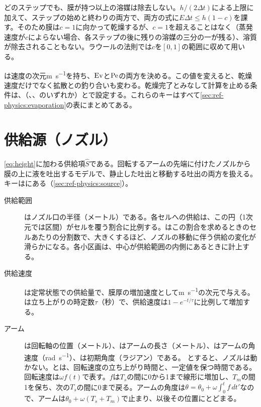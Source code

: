 どのステップでも、膜が持つ以上の溶媒は除去しない。$h/(2\Delta t)$による上限に加えて、ステップの始めと終わりの両方で、両方の式に$E\Delta t \le h(1-c)$を課す。そのため膜は$c = 1$に向かって乾燥するが、$c = 1$を超えることはなく（蒸発速度が$c$によらない場合、各ステップの後に残りの溶媒の三分の一が残る）、溶質が除去されることもない。ラウールの法則では$c$を$[0, 1]$の範囲に収めて用いる。

は速度の次元\si{\metre\per\second}を持ち、$\mathrm{Ev}$と$\mathrm{Pe}$の両方を決める。この値を変えると、乾燥速度だけでなく拡散との釣り合いも変わる。乾燥完了とみなして計算を止める条件は、（、、のいずれか）とで設定する。これらのキーはすべて\cref{sec:ref-physics:evaporation}の表にまとめてある。

\section{供給源（ノズル）}
\label{sec:terms:source}

\cref{eq:height}に加わる供給項$\hat{S}$である。回転するアームの先端に付けたノズルから膜の上に液を吐出するモデルで、静止した吐出と移動する吐出の両方を扱える。キーはにある（\cref{sec:ref-physics:source}）。

\begin{description}
  \item[供給範囲] はノズル口の半径（メートル）である。各セルへの供給は、この円（1次元では区間）がセルを覆う割合に比例する。はこの割合を求めるときのセルあたりの分割数で、大きくするほど、ノズルの移動に伴う供給の変化が滑らかになる。各小区画は、中心が供給範囲の内側にあるときに計上する。
  \item[供給速度] は定常状態での供給量で、膜厚の増加速度として\si{\metre\per\second}の次元で与える。は立ち上がりの時定数$\tau$（秒）で、供給速度は$1 - e^{-t/\tau}$に比例して増加する。
  \item[アーム] は回転軸の位置（メートル）、はアームの長さ（メートル）、はアームの角速度（\si{\radian\per\second}）、は初期角度（ラジアン）である。
    とすると、ノズルは動かない。とは、回転速度の立ち上がり時間と、一定値を保つ時間である。回転速度は$\omega f(t)$で表す。$f$は$T_s$の間に0から1まで線形に増加し、$T_m$の間1を保ち、次の$T_s$の間に0まで戻る。アームの角度は$\theta = \theta_0 + \omega\int_0^t f\,dt'$なので、アームは$\theta_0 + \omega(T_s + T_m)$で止まり、以後その位置にとどまる。
\end{description}

